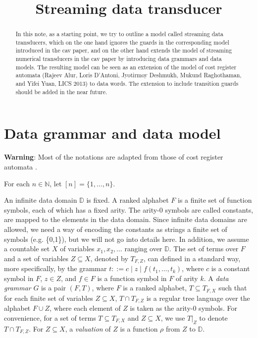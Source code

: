 \documentclass[runningheads,a4paper]{llncs}
\title{Streaming data transducer}
\author{}
\institute{}
\newcommand\dd{\mathbb{D}}
\newcommand\nat{\mathbb{N}}
\begin{document}
\maketitle


\begin{abstract}
In this note, as a starting point, we try to outline a model called streaming data transducers, which on the one hand ignores the guards in the corresponding model introduced in the cav paper, and on the other hand extends the model of streaming numerical transducers in the cav paper by introducing data grammars and data models. The resulting model can be seen as an extension of the model of cost register automata (Rajeev Alur, Loris D'Antoni, Jyotirmoy Deshmukh, Mukund Raghothaman,  and Yifei Yuan, LICS 2013) to data words. The extension to include transition guards should be added in the near future.
\end{abstract}



\section{Data grammar and data model}

{\bf Warning}: Most of the notations are adapted from those of cost register automata \cite{ADD+13}.

For each $n \in \nat$, let $[n]=\{1,\dots, n\}$.

An infinite data domain $\dd$ is fixed.
A ranked alphabet $F$ is a finite set of function symbols, each of which has a fixed arity. The arity-0 symbols are called constants, are mapped to the elements in the data domain. Since infinite data domains are allowed, we need a way of encoding the constants as strings a finite set of symbols (e.g. \{0,1\}), but we will not go into details here. In addition, we assume a  countable set $X$ of variables $x_1, x_2,\dots$ ranging over $\dd$.  The set of terms over $F$ and a set of variables $Z \subseteq X$, denoted by $T_{F, Z}$, can defined in a standard way, more specifically, by the grammar $t::= c \mid z  \mid f(t_1,\dots, t_k)$, where $c$ is a constant symbol in $F$, $z \in Z$, and $f \in F$ is a function symbol in $F$ of arity $k$. A \emph{data grammar} $G$ is a pair $(F, T)$, where $F$ is a ranked alphabet, $T \subseteq T_{F,X}$ such that for each finite set of variables $Z \subseteq X$, $T \cap T_{F, Z}$ is a regular tree language over the alphabet $F \cup Z$, where each element of $Z$ is taken as the arity-0 symbols.  For convenience, for a set of terms $T \subseteq T_{F,X}$ and $Z \subseteq X$, we use $T \vert_Z$ to denote $T \cap T_{F,Z}$.  For $Z \subseteq X$, a \emph{valuation} of $Z$ is a function $\rho$ from $Z$ to $\dd$. 
\end{document}
